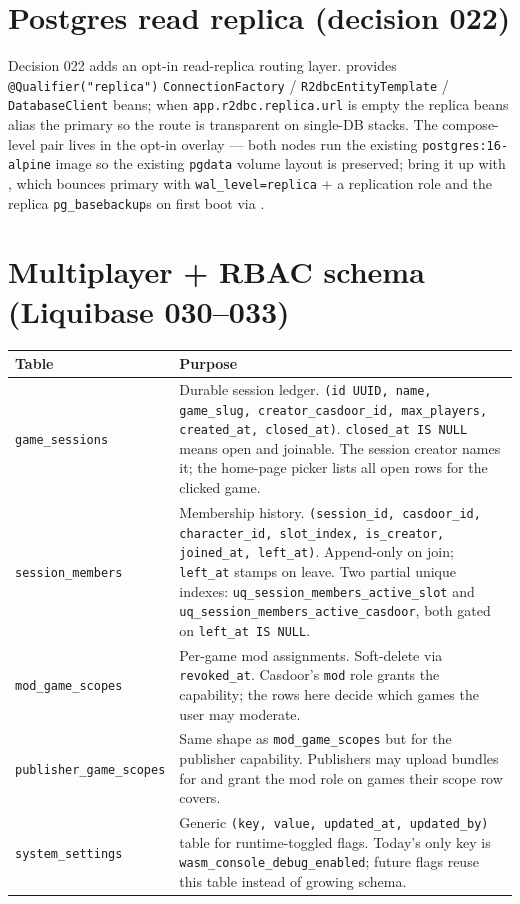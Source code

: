 \section{Postgres read replica (decision 022)}

Decision 022 adds an opt-in read-replica routing layer.
 provides
\texttt{@Qualifier("replica")} \texttt{ConnectionFactory} /
\texttt{R2dbcEntityTemplate} / \texttt{DatabaseClient} beans; when
\texttt{app.r2dbc.replica.url} is empty the replica beans alias the
primary so the route is transparent on single-DB stacks. The
compose-level pair lives in the opt-in overlay
 --- both nodes run the existing
\texttt{postgres:16-alpine} image so the existing \texttt{pgdata} volume
layout is preserved; bring it up with
, which bounces primary with
\texttt{wal\_level=replica} + a replication role and the replica
\texttt{pg\_basebackup}s on first boot via
.

\section{Multiplayer + RBAC schema (Liquibase 030--033)}

\begin{tabularx}{\linewidth}{l X}
\toprule
\textbf{Table} & \textbf{Purpose} \\
\midrule
\texttt{game\_sessions} & Durable session ledger.
\texttt{(id UUID, name, game\_slug, creator\_casdoor\_id,
max\_players, created\_at, closed\_at)}.
\texttt{closed\_at IS NULL} means open and joinable. The session
creator names it; the home-page picker lists all open rows for the
clicked game. \\

\texttt{session\_members} & Membership history.
\texttt{(session\_id, casdoor\_id, character\_id, slot\_index,
is\_creator, joined\_at, left\_at)}. Append-only on join;
\texttt{left\_at} stamps on leave. Two partial unique indexes:
\texttt{uq\_session\_members\_active\_slot} and
\texttt{uq\_session\_members\_active\_casdoor}, both gated on
\texttt{left\_at IS NULL}. \\

\texttt{mod\_game\_scopes} & Per-game mod assignments.
Soft-delete via \texttt{revoked\_at}. Casdoor's \texttt{mod} role
grants the capability; the rows here decide which games the user
may moderate. \\

\texttt{publisher\_game\_scopes} & Same shape as
\texttt{mod\_game\_scopes} but for the publisher capability.
Publishers may upload bundles for and grant the mod role on games
their scope row covers. \\

\texttt{system\_settings} & Generic \texttt{(key, value, updated\_at,
updated\_by)} table for runtime-toggled flags. Today's only key is
\texttt{wasm\_console\_debug\_enabled}; future flags reuse this
table instead of growing schema. \\
\bottomrule
\end{tabularx}

